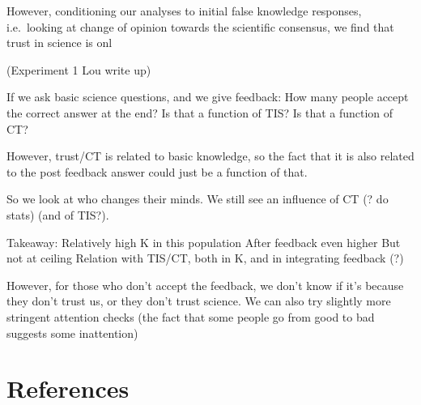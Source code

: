 \documentclass[
  doc,floatsintext]{apa6}
\begin{document}
However, conditioning our analyses to initial false knowledge responses, i.e.~looking at change of opinion towards the scientific consensus, we find that trust in science is onl

(Experiment 1 Lou write up)

If we ask basic science questions, and we give feedback:
How many people accept the correct answer at the end?
Is that a function of TIS?
Is that a function of CT?

However, trust/CT is related to basic knowledge, so the fact that it is also related to the post feedback answer could just be a function of that.

So we look at who changes their minds. We still see an influence of CT (? do stats) (and of TIS?).

Takeaway:
Relatively high K in this population
After feedback even higher
But not at ceiling
Relation with TIS/CT, both in K, and in integrating feedback (?)

However, for those who don't accept the feedback, we don't know if it's because they don't trust us, or they don't trust science.
We can also try slightly more stringent attention checks (the fact that some people go from good to bad suggests some inattention)

\FloatBarrier

\hypertarget{references}{%
\section{References}\label{references}}
\end{document}
